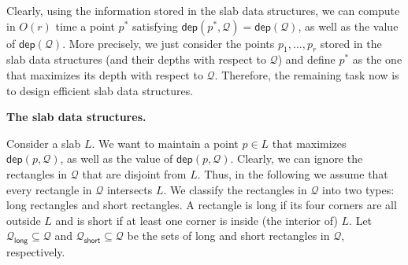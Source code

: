 \documentclass[10pt,a4paper]{article}
\begin{document}
\par
\par
Clearly, using the information stored in the slab data structures, we can compute in $O(r)$ time a point $p^{*}$ satisfying $\mathsf{dep}(p^{*},\mathcal{Q})=\mathsf{dep}(\mathcal{Q})$, as well as the value of $\mathsf{dep}(\mathcal{Q})$. More precisely, we just consider the points $p_{1},\dots,p_{r}$ stored in the slab data structures (and their depths with respect to $\mathcal{Q}$) and define $p^{*}$ as the one that maximizes its depth with respect to $\mathcal{Q}$. Therefore, the remaining task now is to design efficient slab data structures.
\par
\par
\par\medskip\noindent\textbf{The slab data structures.}\par
Consider a slab $L$. We want to maintain a point $p\in L$ that maximizes $\mathsf{dep}(p,\mathcal{Q})$, as well as the value of $\mathsf{dep}(p,\mathcal{Q})$. Clearly, we can ignore the rectangles in $\mathcal{Q}$ that are disjoint from $L$. Thus, in the following we assume that every rectangle in $\mathcal{Q}$ intersects $L$. We classify the rectangles in $\mathcal{Q}$ into two types: long rectangles and short rectangles. A rectangle is long if its four corners are all outside $L$ and is short if at least one corner is inside (the interior of) $L$. Let $\mathcal{Q}_{\mathsf{long}}\subseteq\mathcal{Q}$ and $\mathcal{Q}_{\mathsf{short}}\subseteq\mathcal{Q}$ be the sets of long and short rectangles in $\mathcal{Q}$, respectively.
\par
\par
\end{document}
